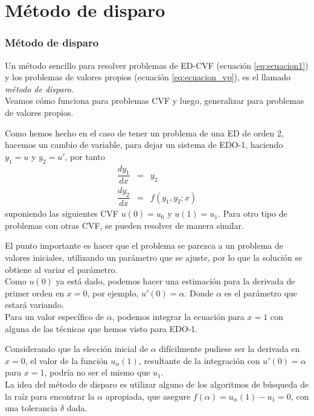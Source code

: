 \section{Método de disparo}
\begin{frame}
\frametitle{Método de disparo}
Un método sencillo para resolver problemas de ED-CVF (ecuación \ref{eq:ecuacion1}) y los problemas de valores propios (ecuación \ref{eq:ecuacion_vp}), es el llamado \emph{método de disparo}.
\\
\medskip
Veamos cómo funciona para problemas CVF y luego, generalizar para problemas de valores propios.
\end{frame}
\begin{frame}
Como hemos hecho en el caso de tener un problema de una ED de orden 2, hacemos un cambio de variable, para dejar un sistema de EDO-1, haciendo $y_{1}=u$ y $y_{2}=u'$, por tanto
\begin{eqnarray}
\dfrac{dy_{1}}{dx} &=& y_{2} \\
\dfrac{dy_{2}}{dx} &=& f(y_{1}, y_{2}; x)
\end{eqnarray}
suponiendo las siguientes CVF $u(0)= u_{0}$ y $u(1)= u_{1}$. Para otro tipo de problemas con otras CVF, se pueden resolver de manera similar.
\end{frame}
\begin{frame}
El punto importante es hacer que el problema se parezca a un problema de valores iniciales, utilizando un parámetro que se ajuste, por lo que la solución se obtiene al variar el parámetro.
\\
\medskip
Como $u(0)$ ya está dado, podemos hacer una estimación para la derivada de primer orden en $x=0$, por ejemplo, $u'(0)=\alpha$. Donde $\alpha$ es el parámetro que estará variando.
\\
\medskip
\pause
Para un valor específico de $\alpha$, podemos integrar la ecuación para $x=1$ con alguna de las técnicas que hemos visto para EDO-1.
\end{frame}
\begin{frame}
Considerando que la elección inicial de  $\alpha$ difícilmente pudiese ser la derivada en $x = 0$, el valor de la función $u_{\alpha} (1)$, resultante de la integración con $u'(0) = \alpha$  para $x = 1$, podría no ser el mismo que $u_{1}$.
\\
\medskip
La idea del método de disparo es utilizar alguno de los algoritmos de búsqueda de la raíz para encontrar la $\alpha$ apropiada, que asegure $f(\alpha) = u_{\alpha} (1) - u_{1} = 0$, con una tolerancia $\delta$ dada.
\end{frame}
